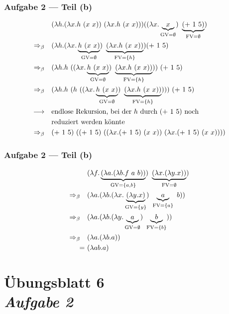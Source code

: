 \documentclass{beamer}
\DeclareMathOperator{\GV}{GV}
\DeclareMathOperator{\FV}{FV}
\begin{document}
\begin{frame} \frametitle{Aufgabe 2 --- Teil (b)}
	\begin{align*}
		& (\lambda h . (\lambda x . h \ (x \ x)) \ (\lambda x . h \ (x \ x))) ((\lambda x . \underbrace{x}_{\GV = \emptyset}) \ \underbrace{(+ \ 1 \ 5)}_{ \FV = \emptyset})
		\\
		\Rightarrow_\beta \quad
		& (\lambda h . (\lambda x . \underbrace{h \ (x \ x)}_{\GV = \emptyset}) \ \underbrace{(\lambda x . h \ (x \ x))}_{\FV = \menge{h}}) (+ \ 1 \ 5)
		\\
		\Rightarrow_\beta \quad
		& (\lambda h . h \ ((\lambda x . \underbrace{h \ (x \ x)}_{\GV = \emptyset}) \ \underbrace{(\lambda x . h \ (x \ x))}_{\FV= \menge{h}})) \ (+ \ 1 \ 5)
		\\
		\Rightarrow_\beta \quad
		& (\lambda h . h \ ( h \ ((\lambda x . \underbrace{h \ (x \ x)}_{\GV = \emptyset}) \ \underbrace{(\lambda x . h \ (x \ x))}_{\FV= \menge{h}}))) \ (+ \ 1 \ 5)
		\\
		\longrightarrow \quad
		&\text{endlose Rekursion, bei der $h$ durch $(+ \ 1 \ 5 )$ noch} \\
		&\text{reduziert werden könnte}
		\\
		\Rightarrow_\beta \quad
		& (+ \ 1 \ 5) \ ( (+ \ 1 \ 5) \ ((\lambda x . (+ \ 1 \ 5 ) \ (x \ x)) \ (\lambda x . (+ \ 1 \ 5 ) \ (x \ x))))	
	\end{align*}
\end{frame}

\begin{frame} \frametitle{Aufgabe 2 --- Teil (b)}
	\begin{align*}
		& (\lambda f . \underbrace{(\lambda a . (\lambda b . f \ a \ b))}_{\GV = \menge{a,b}}) \ \underbrace{(\lambda x . (\lambda y . x ))}_{\FV= \emptyset}) 
		\\
		\Rightarrow_\beta \quad
		& (\lambda a . (\lambda b . (\lambda x . \underbrace{(\lambda y . x )}_{\GV = \menge{y}}) \ \underbrace{a}_{\FV = \menge{a}} \ b)) 
		\\
		\Rightarrow_\beta \quad
		& (\lambda a . (\lambda b . (\lambda y . \underbrace{a}_{\GV = \emptyset}) \ \underbrace{b}_{\FV = \menge{b}})) 
		\\
		\Rightarrow_\beta \quad
		& (\lambda a . (\lambda b . a)) 
		\\
		= \ & (\lambda ab . a)
	\end{align*}
\end{frame}


\section{Übungsblatt 6 \\ \textit{\normalsize Aufgabe 2}}
\end{document}
